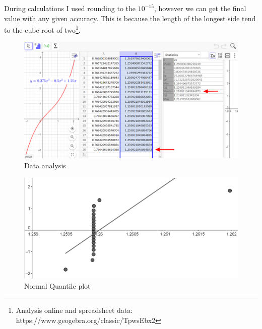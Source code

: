\documentclass[12pt, letterpaper, oneside]{report}
\begin{document}
During calculations I used rounding to the  $10^{-15}$, however we can get the final value with any given accuracy. This is because the length of the longest side tend to the cube root of two\footnote{Analysis online and spreadsheet data:  https://www.geogebra.org/classic/TpwsEbx2}.
\\
\begin{figure}[h]
	\centering
	\includegraphics[width=0.9\linewidth]{images/Table_arrow.png}
	\caption{Data analysis}
	\label{fig:data}
\end{figure}
\begin{figure}[h]
	\centering
	\includegraphics[width=0.9\linewidth]{images/plot.png}
	\caption{Normal Quantile plot}
	\label{fig:plot}
\end{figure}
\newpage
\end{document}
